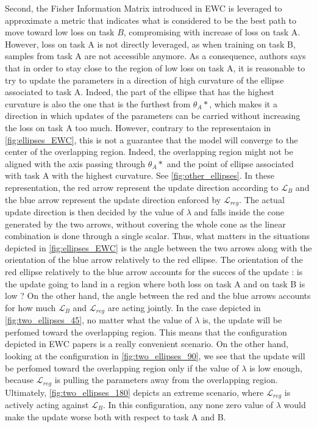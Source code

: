 \documentclass[11pt]{article}
\begin{document}
\vspace{2mm}
\noindent
Second, the Fisher Information Matrix introduced in EWC is leveraged to approximate a metric that indicates what is considered to be the best path to move toward low loss on task $B$, compromising with increase of loss on task A. However, loss on task A is not directly leveraged, as when training on task B, samples from task A are not accessible anymore. As a consequence, authors says that in order to stay close to the region of low loss on task A, it is reasonable to try to update the parameters in a direction of high curvature of the ellipse associated to task A. Indeed, the part of the ellipse that has the highest curvature is also the one that is the furthest from $\theta_A*$, which makes it a direction in which updates of the parameters can be carried without increasing the loss on task A too much. However, contrary to the representaion in \ref{fig:ellipses_EWC}, this is not a guarantee that the model will converge to the center of the overlapping region. Indeed, the overlapping region might not be aligned with the axis passing through $\theta_A*$ and the point of ellipse associated with task A with the highest curvature. See \ref{fig:other_ellipses}. In these representation, the red arrow represent the update direction according to $\mathcal{L}_{B}$ and the blue arrow represent the update direction enforced by $\mathcal{L}_{reg}$. The actual update direction is then decided by the value of $\lambda$ and falls inside the cone generated by the two arrows, without covering the whole cone as the linear combination is done through a single scalar. Thus, what matters in the situations depicted in \ref{fig:ellipses_EWC} is the angle between the two arrows along with the orientation of the blue arrow relatively to the red ellipse. The orientation of the red ellipse relatively to the blue arrow accounts for the succes of the update : is the update going to land in a region where both loss on task A and on task B is low ? On the other hand, the angle between the red and the blue arrows accounts for how much $\mathcal{L}_{B}$ and $\mathcal{L}_{reg}$ are acting jointly. In the case depicted in \ref{fig:two_ellipses_45}, no matter what the value of $\lambda$ is, the update will be perfomed toward the overlapping region. This means that the configuration depicted in EWC papers is a really convenient scenario. On the other hand, looking at the configuration in \ref{fig:two_ellipses_90}, we see that the update will be perfomed toward the overlapping region only if the value of $\lambda$ is low enough, because $\mathcal{L}_{reg}$ is pulling the parameters away from the overlapping region. Ultimately, \ref{fig:two_ellipses_180} depicts an extreme scenario, where $\mathcal{L}_{reg}$ is actively acting against $\mathcal{L}_B$. In this configuration, any none zero value of $\lambda$ would make the update worse both with respect to task A and B.
\end{document}
